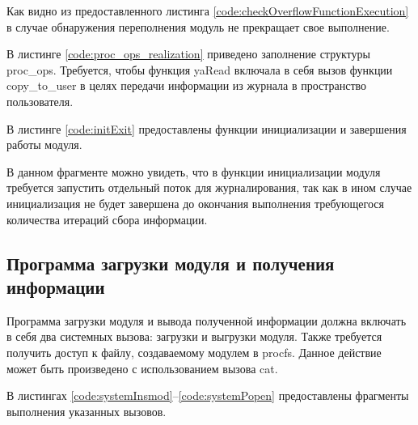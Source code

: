Как видно из предоставленного листинга \ref{code:checkOverflowFunctionExecution} в случае обнаружения переполнения модуль не прекращает свое выполнение.

В листинге \ref{code:proc_ops_realization} приведено заполнение структуры proc\_ops. Требуется, чтобы функция yaRead включала в себя вызов функции copy\_to\_user в целях передачи информации из журнала в пространство пользователя.


В листинге \ref{code:initExit} предоставлены функции инициализации и завершения работы модуля.


В данном фрагменте можно увидеть, что в функции инициализации модуля требуется запустить отдельный поток для журналирования, так как в ином случае инициализация не будет завершена до окончания выполнения требующегося количества итераций сбора информации.

\subsection{Программа загрузки модуля и получения информации}
Программа загрузки модуля и вывода полученной информации должна включать в себя два системных вызова: загрузки и выгрузки модуля. Также требуется получить доступ к файлу, создаваемому модулем в procfs. Данное действие может быть произведено с использованием вызова cat.

В листингах \ref{code:systemInsmod}--\ref{code:systemPopen} предоставлены фрагменты выполнения указанных вызовов.


